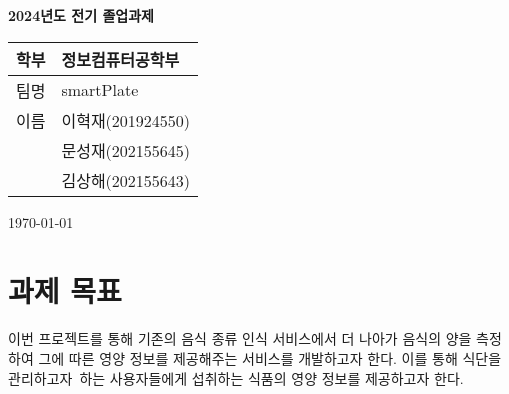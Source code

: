 \documentclass[10pt, a4paper]{article}
\newcommand\hwnumber{중간보고서}                                 %
\newcommand\Information{2024년도 전기 졸업과제}                        %
\newcommand{\tb}[1]{\textbf{#1}}
\theoremstyle{definition}
\begin{document}
    \begin{titlepage}
        \begin{center}
            \vspace*{3cm}

            \Huge
            \textbf{}

            \vspace{1cm}
            {
                \fontsize{50}{50}
                 \selectfont {\hwnumber}}


            \vspace{1.5cm}
            \Large


            \tb{\Information}                   %


            \vfill
            \begin{flushright}
                \Large
                \begin{tabularx}{0.5\textwidth}{l >{\raggedleft\arraybackslash}X}
                    학부 & 정보컴퓨터공학부       \\
                    \hline
                    팀명 & smartPlate     \\
                    \hline
                    이름 & 이혁재(201924550) \\
                    & 문성재(202155645) \\
                    & 김상해(202155643) \\

                \end{tabularx}
            \end{flushright}
            \today

        \end{center}
    \end{titlepage}
    \newpage
    \tableofcontents
    \newpage

    \section{과제 목표}\label{sec:과제 목표}
    이번 프로젝트를 통해 기존의 음식 종류 인식 서비스에서 더 나아가 음식의 양을 측정하여 그에 따른 영양 정보를 제공해주는 서비스를 개발하고자 한다. 이를 통해 식단을 관리하고자\ 하는 사용자들에게 섭취하는 식품의 영양 정보를 제공하고자 한다.
\end{document}
